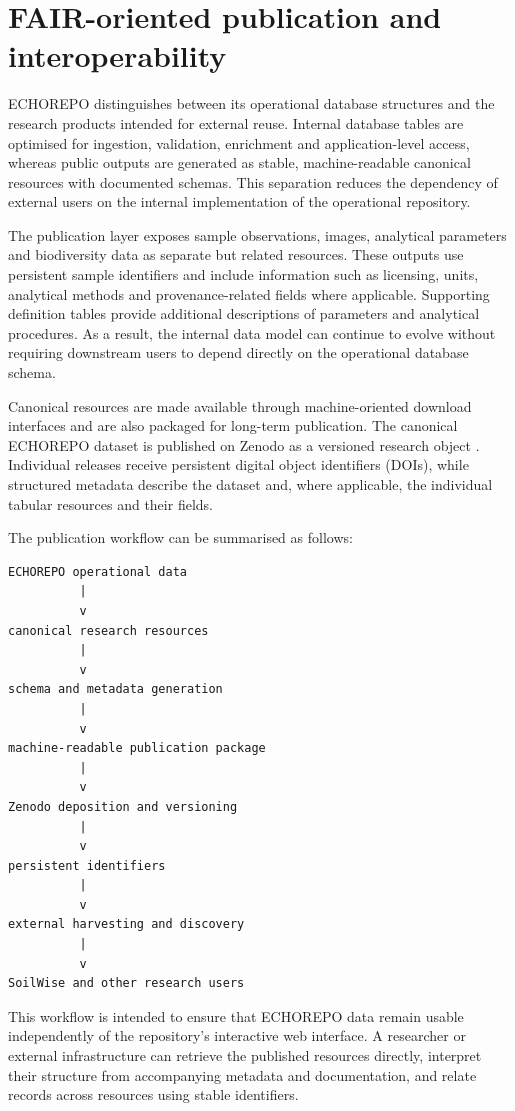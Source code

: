\section{FAIR-oriented publication and interoperability}

ECHOREPO distinguishes between its operational database structures and the
research products intended for external reuse. Internal database tables are
optimised for ingestion, validation, enrichment and application-level access,
whereas public outputs are generated as stable, machine-readable canonical
resources with documented schemas. This separation reduces the dependency of
external users on the internal implementation of the operational repository.

The publication layer exposes sample observations, images, analytical
parameters and biodiversity data as separate but related resources. These
outputs use persistent sample identifiers and include information such as
licensing, units, analytical methods and provenance-related fields where
applicable. Supporting definition tables provide additional descriptions of
parameters and analytical procedures. As a result, the internal data model can
continue to evolve without requiring downstream users to depend directly on the
operational database schema.

Canonical resources are made available through machine-oriented download
interfaces and are also packaged for long-term publication. The canonical
ECHOREPO dataset is published on Zenodo as a versioned research object
\parencite{echorepo2026dataset}. Individual releases receive persistent digital
object identifiers (DOIs), while structured metadata describe the dataset and,
where applicable, the individual tabular resources and their fields.

The publication workflow can be summarised as follows:

\begin{verbatim}
ECHOREPO operational data
          |
          v
canonical research resources
          |
          v
schema and metadata generation
          |
          v
machine-readable publication package
          |
          v
Zenodo deposition and versioning
          |
          v
persistent identifiers
          |
          v
external harvesting and discovery
          |
          v
SoilWise and other research users
\end{verbatim}

This workflow is intended to ensure that ECHOREPO data remain usable
independently of the repository's interactive web interface. A researcher or
external infrastructure can retrieve the published resources directly,
interpret their structure from accompanying metadata and documentation, and
relate records across resources using stable identifiers.

